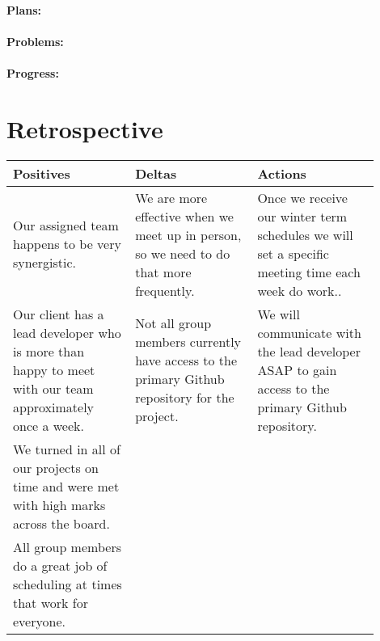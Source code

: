 \documentclass[onecolumn, draftclsnofoot,10pt, compsoc]{article}
\begin{document}
		    \paragraph{Plans:} \hfill \break
		
		    \paragraph{Problems:} \hfill \break
		
		    \paragraph{Progress:} \hfill \break
		
		
\section{Retrospective}
\begin{center}
    \begin{tabular}{ |  p{0.3\linewidth} | p{0.3\linewidth} |  p{0.3\linewidth} |}
    \hline
    Positives & Deltas & Actions \\ \hline
    Our assigned team happens to be very synergistic. & We are more effective when we meet up in person, so we need to do that more frequently.
    & Once we receive our winter term schedules we will set a specific meeting time each week do work..  \\ \hline
    Our client has a lead developer who is more than happy to meet with our team approximately once a week. &
    Not all group members currently have access to the primary Github repository for the project. &
    We will communicate with the lead developer ASAP to gain access to the primary Github repository.  \\ \hline
    We turned in all of our projects on time and were met with high marks across the board. & & \\ \hline
    All group members do a great job of scheduling at times that work for everyone. &  & \\ \hline
    \end{tabular}
\end{center}
\end{document}
